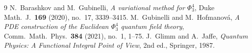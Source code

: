 \documentclass[12pt]{article}
\theoremstyle{definition}
\begin{document}
\begin{thebibliography}{9}
 N.~Barashkov and M.~Gubinelli,
\emph{A variational method for $\Phi^4_3$}, Duke Math.\ J.\ \textbf{169} (2020), no.~17,
3339--3415.
 M.~Gubinelli and M.~Hofmanov\'a,
\emph{A PDE construction of the Euclidean $\Phi^4_3$ quantum field theory},
Comm.\ Math.\ Phys.\ \textbf{384} (2021), no.~1, 1--75.
 J.~Glimm and A.~Jaffe,
\emph{Quantum Physics: A Functional Integral Point of View}, 2nd ed., Springer, 1987.
\end{thebibliography}
\end{document}
